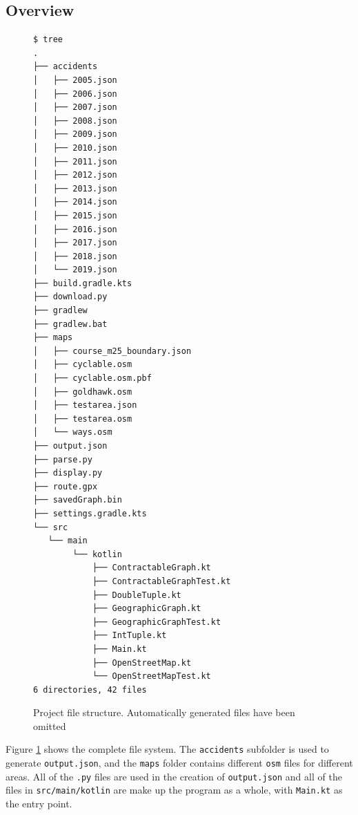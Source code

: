 \documentclass[11pt,twoside,a4paper]{article}
\begin{document}
\subsection{Overview}
\begin{figure}[p]
\begin{verbatim}
$ tree
.
├── accidents
│   ├── 2005.json
│   ├── 2006.json
│   ├── 2007.json
│   ├── 2008.json
│   ├── 2009.json
│   ├── 2010.json
│   ├── 2011.json
│   ├── 2012.json
│   ├── 2013.json
│   ├── 2014.json
│   ├── 2015.json
│   ├── 2016.json
│   ├── 2017.json
│   ├── 2018.json
│   └── 2019.json
├── build.gradle.kts
├── download.py
├── gradlew
├── gradlew.bat
├── maps
│   ├── course_m25_boundary.json
│   ├── cyclable.osm
│   ├── cyclable.osm.pbf
│   ├── goldhawk.osm
│   ├── testarea.json
│   ├── testarea.osm
│   └── ways.osm
├── output.json
├── parse.py
├── display.py
├── route.gpx
├── savedGraph.bin
├── settings.gradle.kts
└── src
   └── main
        └── kotlin
            ├── ContractableGraph.kt
            ├── ContractableGraphTest.kt
            ├── DoubleTuple.kt
            ├── GeographicGraph.kt
            ├── GeographicGraphTest.kt
            ├── IntTuple.kt
            ├── Main.kt
            ├── OpenStreetMap.kt
            └── OpenStreetMapTest.kt
6 directories, 42 files
\end{verbatim}
\caption{Project file structure. Automatically generated files have been omitted}
\label{fsystem}
\end{figure}
Figure \ref{fsystem} shows the complete file system. The \texttt{accidents} subfolder is used to generate \texttt{output.json}, and the \texttt{maps} folder contains different \texttt{osm} files for 
different areas. All of the \texttt{.py} files are used in the creation of \texttt{output.json} and all of the files in \texttt{src/main/kotlin} are make up the program as a whole, with \texttt{Main.kt} as the entry point.
\end{document}
